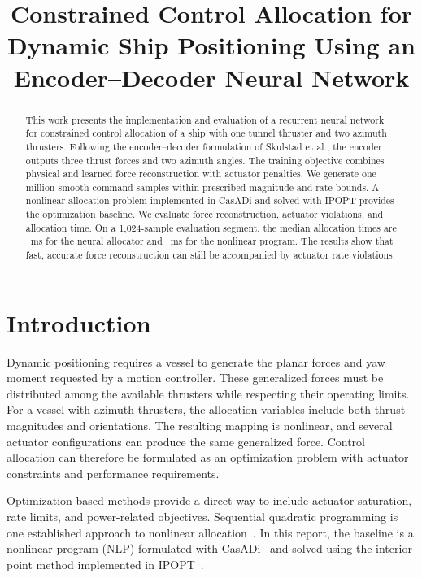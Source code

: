 \documentclass[conference]{IEEEtran}
\begin{document}
\raggedbottom
\title{Constrained Control Allocation for Dynamic Ship Positioning Using an Encoder--Decoder Neural Network}
\author{
}
\maketitle

\begin{abstract}
This work presents the implementation and evaluation of a recurrent neural
network for constrained control allocation of a ship with one tunnel thruster
and two azimuth thrusters. Following the encoder--decoder formulation of
Skulstad et al., the encoder outputs three thrust forces and two azimuth angles.
The training objective combines physical and learned force reconstruction
with actuator penalties. We generate one million smooth command samples
within prescribed magnitude and rate bounds. A nonlinear allocation problem
implemented in CasADi and solved with IPOPT provides the optimization baseline.
We evaluate force reconstruction, actuator violations, and allocation time.
On a 1,024-sample evaluation segment, the median allocation times are
\NNMedian~ms for the neural allocator and \NLPMedian~ms for the nonlinear
program. The results show that fast, accurate force reconstruction can still
be accompanied by actuator rate violations.
\end{abstract}
\IEEEpeerreviewmaketitle

\section{Introduction}
Dynamic positioning requires a vessel to generate the planar forces and yaw
moment requested by a motion controller. These generalized forces must be
distributed among the available thrusters while respecting their operating
limits. For a vessel with azimuth thrusters, the allocation variables include
both thrust magnitudes and orientations. The resulting mapping is nonlinear,
and several actuator configurations can produce the same generalized force.
Control allocation can therefore be formulated as an optimization problem
with actuator constraints and performance requirements.

Optimization-based methods provide a direct way to include actuator
saturation, rate limits, and power-related objectives.
Sequential quadratic programming is one established approach to nonlinear
allocation~\cite{Johansen2004}. In this report, the baseline is a nonlinear
program (NLP) formulated with CasADi~\cite{Andersson2019} and solved using
the interior-point method implemented in IPOPT~\cite{Wachter2006}.
\end{document}
